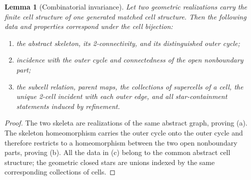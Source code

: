 \documentclass[11pt]{article}
\theoremstyle{mainplain}
\theoremstyle{mainroman}
\newtheorem{longlemma}[theorem]{Lemma}
\theoremstyle{definition}
\newcommand{\alphlabels}{\renewcommand{\labelenumi}{\textup{(\alph{enumi})}}%
  \renewcommand{\theenumi}{\alph{enumi}}}
\numberwithin{equation}{section}
\begin{document}
\begin{longlemma}[Combinatorial invariance]\label{lem:combinatorial-invariance}
Let two geometric realizations carry the finite cell structure of one
generated matched cell structure. Then the following data and properties correspond under the
cell bijection:
\begin{enumerate}\alphlabels
\item the abstract skeleton, its 2-connectivity, and its distinguished
      outer cycle;
\item incidence with the outer cycle and connectedness of the open
      nonboundary part;
\item the subcell relation, parent maps, the collections of supercells of
      a cell, the unique 2-cell incident with each outer edge, and all star-containment statements induced by refinement.
\end{enumerate}
\end{longlemma}
\begin{proof}
The two skeleta are realizations of the same abstract graph, proving
(a). The skeleton homeomorphism carries the outer cycle onto the outer
cycle and therefore restricts to a homeomorphism between the two open
nonboundary parts, proving (b). All the data in (c) belong to the common
abstract cell structure; the geometric closed stars are unions indexed
by the same corresponding collections of cells.
\end{proof}
\end{document}
